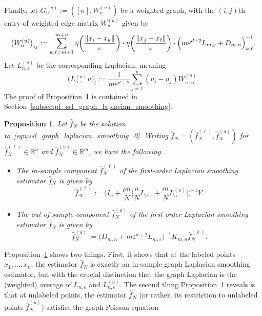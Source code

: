 \documentclass{article}
\newcommand{\Reals}{\mathbb{R}}
\newcommand{\1}{\mathbf{1}}
\newcommand{\wh}[1]{\widehat{#1}}
\theoremstyle{alden}
\theoremstyle{aldenthm}
\newtheorem{proposition}{Proposition}
\theoremstyle{definition}
\theoremstyle{remark}
\begin{document}
Finally, let $G_n^{(u)} := ([n], W_n^{(u)})$ be a weighted graph, with the $(i,j)$th entry of weighted edge matrix $W_n^{(u)}$ given by
\begin{equation*}
\bigl(W_{n}^{(u)}\bigr)_{ij} := \sum_{k,\ell = m + 1}^{m + n} \eta\biggl(\frac{\|x_i - x_k\|}{\varepsilon}\biggr) \cdot \eta\biggl(\frac{\|x_j - x_{\ell}\|}{\varepsilon}\biggr) \cdot \Bigl(m\varepsilon^{d + 2}L_{m,\varepsilon} + D_{m,n}\Bigr)_{k,\ell}^{-1}.
\end{equation*}
Let $L_{n,\varepsilon}^{(u)}$ be the corresponding Laplacian, meaning
\begin{equation*}
\bigl(L_{n,\varepsilon}^{(u)}u\bigr)_{i} := \frac{1}{m\varepsilon^{d + 2}} \sum_{j = 1}^{n} (u_i - u_j) W_{n,ij}^{(u)}.
\end{equation*}
The proof of Proposition~\ref{prop:ssl_graph_laplacian_smoothing} is contained in Section~\ref{subsec:pf_ssl_graph_laplacian_smoothing}. 
\begin{proposition}
	\label{prop:ssl_graph_laplacian_smoothing}
	Let $\wh{f}_N$ be the solution to~\eqref{eqn:ssl_graph_laplacian_smoothing_0}. Writing $\wh{f}_N = (\wh{f}_N^{(\ell)},\wh{f}_N^{(u)})$ for $\wh{f}_N^{(\ell)} \in \Reals^n$ and $\wh{f}_N^{(u)} \in \Reals^m$, we have the following.
	\begin{itemize}
		\item The in-sample component $\wh{f}_N^{(\ell)}$ of the first-order Laplacian smoothing estimator $\wh{f}_N$ is given by
		\begin{equation*}
		\wh{f}_N^{(\ell)} := \biggl(I_n + \frac{\rho n}{N}\biggl[\frac{n}{N}L_{n,\varepsilon} + \frac{m}{N}L_{n,\varepsilon}^{(u)}\biggr]\biggr)^{-1} Y.
		\end{equation*}
		\item The out-of-sample component $\wh{f}_N^{(u)}$ of the first-order Laplacian smoothing estimator $\wh{f}_N$ is given by
		\begin{equation*}
		\wh{f}_N^{(u)} := \bigl(D_{m,n} + m\varepsilon^{d + 2}L_{m,\varepsilon}\bigr)^{-1} K_{m,n} \wh{f}_N^{(\ell)}.
		\end{equation*}
	\end{itemize}
\end{proposition}
Proposition~\ref{prop:ssl_graph_laplacian_smoothing} shows two things. First, it shows that at the labeled points $x_1,\ldots,x_n$, the estimator $\wh{f}_N$ is exactly an in-sample graph Laplacian smoothing estimator, but with the crucial distinction that the graph Laplacian is the (weighted) average of $L_{n,\varepsilon}$ and $L_{n,\varepsilon}^{(u)}$. The second thing Proposition~\ref{prop:ssl_graph_laplacian_smoothing} reveals is that at unlabeled points, the estimator $\wh{f}_N$ (or rather, its restriction to unlabeled points $\wh{f}_N^{(u)}$) satisfies the graph Poisson equation
\end{document}
